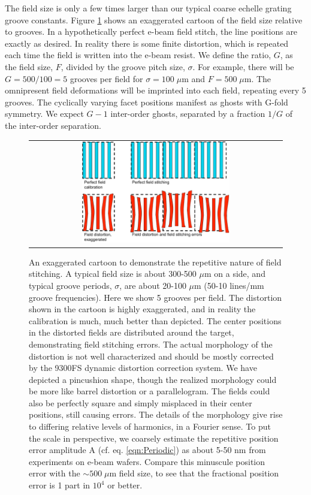 \documentclass[]{spie}  %
\begin{document}
The field size is only a few times larger than our typical coarse echelle grating groove constants.  Figure \ref{fig:FieldCartoon} shows an exaggerated cartoon of the field size relative to grooves.  In a hypothetically perfect e-beam field stitch, the line positions are exactly as desired.  In reality there is some finite distortion, which is repeated each time the field is written into the e-beam resist.  We define the ratio, $G$, as the field size, $F$, divided by the groove pitch size, $\sigma$.  For example, there will be $G=500/100=5$ grooves per field for $\sigma = 100 \; \mu$m and $F = 500 \; \mu$m.  The omnipresent field deformations will be imprinted into each field, repeating every 5 grooves.  The cyclically varying facet positions manifest as ghosts with G-fold symmetry. We expect $G-1$ inter-order ghosts, separated by a fraction $1/G$ of the inter-order separation.


\begin{figure}
\begin{center}
 \begin{tabular}{c}
    \includegraphics[width=0.6\textwidth]{figs/Field_stitching_errors_alt2.pdf}
   \end{tabular}
  \end{center}
  \caption[Field Stitching Error Cartoon]{\label{fig:FieldCartoon} An exaggerated cartoon to demonstrate the repetitive nature of field stitching.  A typical field size is about 300-500 $\mu$m on a side, and typical groove periods, $\sigma$, are about 20-100 $\mu$m (50-10 lines/mm groove frequencies).  Here we show 5 grooves per field.  The distortion shown in the cartoon is highly exaggerated, and in reality the calibration is much, much better than depicted.  The center positions in the distorted fields are distributed around the target, demonstrating field stitching errors.  The actual morphology of the distortion is not well characterized and should be mostly corrected by the 9300FS dynamic distortion correction system.  We have depicted a pincushion shape, though the realized morphology could be more like barrel distortion or a parallelogram.  The fields could also be perfectly square and simply misplaced in their center positions, still causing errors.  The details of the morphology give rise to differing relative levels of harmonics, in a Fourier sense.  To put the scale in perspective, we coarsely estimate the repetitive position error amplitude A (cf. eq. \ref{eqn:Periodic}) as about 5-50 nm from experiments on e-beam wafers.  Compare this minuscule position error with the $\sim500 \; \mu$m field size, to see that the fractional position error is 1 part in $10^4$ or better.}
\end{figure}
\end{document}
